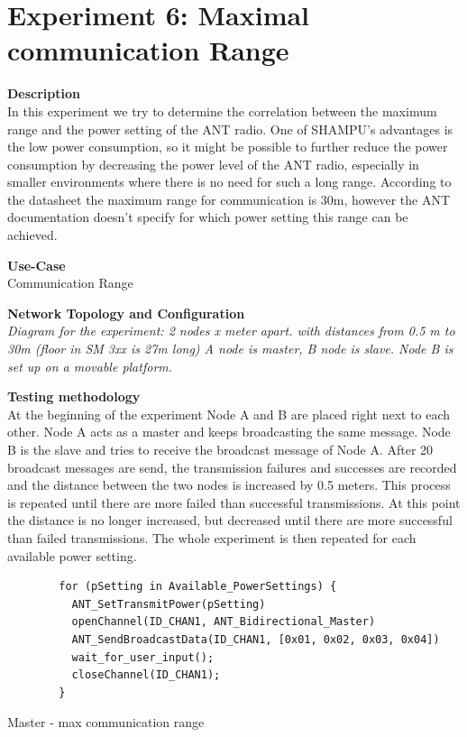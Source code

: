 \section{Experiment 6: Maximal communication Range}
\begin{description} 
	\item{\textbf{Description}} \hfill \\  In this experiment we try to determine the correlation between the maximum range and the power setting of the ANT radio. One of SHAMPU's advantages is the low power consumption, so it might be possible to further reduce the power consumption by decreasing the power level of the ANT radio, especially in smaller environments where there is no need for such a long range.
	According to the datasheet the maximum range for communication is 30m, however the ANT documentation doesn't specify for which power setting this range can be achieved. 

	\item{\textbf{Use-Case}} \hfill \\ Communication Range		
	\item{\textbf{Network Topology and Configuration}} \hfill \\ \textit{Diagram for the experiment:  2 nodes   x meter apart.  with distances from 0.5 m to 30m  (floor in SM 3xx is 27m long)  A node is master, B node is slave. Node B is set up on a movable platform.}\\  

	\item{\textbf{Testing methodology}} \hfill \\ At the beginning of the experiment Node A and B are placed right next to each other. Node A acts as a master and keeps broadcasting the same message. Node B is the slave and tries to receive the broadcast message of Node A. After 20 broadcast messages are send, the transmission failures and successes are recorded and the distance between the two nodes is increased by 0.5 meters. This process is repeated until there are more failed than successful transmissions. At this point the distance is no longer increased, but decreased until there are more successful than failed transmissions. The whole experiment is then repeated for each available power setting.
	
	\begin{code}
		\begin{verbatim}
		for (pSetting in Available_PowerSettings) {
		  ANT_SetTransmitPower(pSetting)
		  openChannel(ID_CHAN1, ANT_Bidirectional_Master)
		  ANT_SendBroadcastData(ID_CHAN1, [0x01, 0x02, 0x03, 0x04])
		  wait_for_user_input();
		  closeChannel(ID_CHAN1);
		}
		\end{verbatim}
		\caption{Master - max communication range}\label{lst:mExp6}
	\end{code}
	

\end{description}
